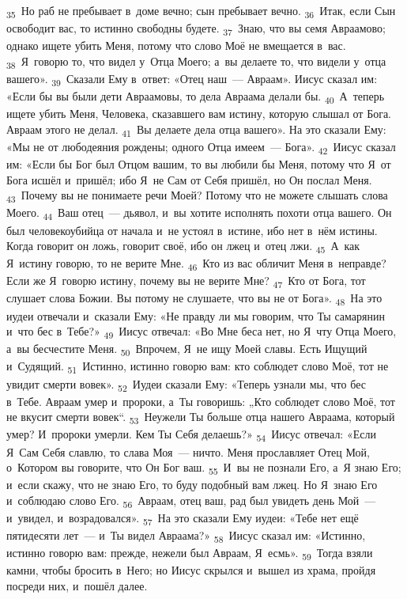 \documentclass[a4paper,12pt]{article}
\begin{document}
\textsubscript{35}~Но раб не пребывает в~доме вечно; сын пребывает вечно.
\textsubscript{36}~Итак, если Сын освободит вас, то истинно свободны будете.
\textsubscript{37}~Знаю, что вы семя Авраамово; однако ищете убить Меня, потому что слово Моё не вмещается в~вас.
\textsubscript{38}~Я~говорю то, что видел у~Отца Моего; а~вы делаете то, что видели у~отца вашего».
\textsubscript{39}~Сказали Ему в~ответ: «Отец наш~--- Авраам». Иисус сказал им: «Если бы вы были дети Авраамовы, то дела Авраама делали бы.
\textsubscript{40}~А~теперь ищете убить Меня, Человека, сказавшего вам истину, которую слышал от Бога. Авраам этого не делал.
\textsubscript{41}~Вы делаете дела отца вашего». На это сказали Ему: «Мы не от любодеяния рождены; одного Отца имеем~--- Бога».
\textsubscript{42}~Иисус сказал им: «Если бы Бог был Отцом вашим, то вы любили бы Меня, потому что Я~от Бога исшёл и~пришёл; ибо Я~не Сам от Себя пришёл, но Он послал Меня.
\textsubscript{43}~Почему вы не понимаете речи Моей? Потому что не можете слышать слова Моего.
\textsubscript{44}~Ваш отец~--- дьявол, и~вы хотите исполнять похоти отца вашего. Он был человекоубийца от начала и~не устоял в~истине, ибо нет в~нём истины. Когда говорит он ложь, говорит своё, ибо он лжец и~отец лжи.
\textsubscript{45}~А~как Я~истину говорю, то не верите Мне.
\textsubscript{46}~Кто из вас обличит Меня в~неправде? Если же Я~говорю истину, почему вы не верите Мне?
\textsubscript{47}~Кто от Бога, тот слушает слова Божии. Вы потому не слушаете, что вы не от Бога».
\textsubscript{48}~На это иудеи отвечали и~сказали Ему: «Не правду ли мы говорим, что Ты самарянин и~что бес в~Тебе?»
\textsubscript{49}~Иисус отвечал: «Во Мне беса нет, но Я~чту Отца Моего, а~вы бесчестите Меня.
\textsubscript{50}~Впрочем, Я~не ищу Моей славы. Есть Ищущий и~Судящий.
\textsubscript{51}~Истинно, истинно говорю вам: кто соблюдет слово Моё, тот не увидит смерти вовек».
\textsubscript{52}~Иудеи сказали Ему: «Теперь узнали мы, что бес в~Тебе. Авраам умер и~пророки, а~Ты говоришь: „Кто соблюдет слово Моё, тот не вкусит смерти вовек“.
\textsubscript{53}~Неужели Ты больше отца нашего Авраама, который умер? И~пророки умерли. Кем Ты Себя делаешь?»
\textsubscript{54}~Иисус отвечал: «Если Я~Сам Себя славлю, то слава Моя~--- ничто. Меня прославляет Отец Мой, о~Котором вы говорите, что Он Бог ваш.
\textsubscript{55}~И~вы не познали Его, а~Я знаю Его; и~если скажу, что не знаю Его, то буду подобный вам лжец. Но Я~знаю Его и~соблюдаю слово Его.
\textsubscript{56}~Авраам, отец ваш, рад был увидеть день Мой~--- и~увидел, и~возрадовался».
\textsubscript{57}~На это сказали Ему иудеи: «Тебе нет ещё пятидесяти лет~--- и~Ты видел Авраама?»
\textsubscript{58}~Иисус сказал им: «Истинно, истинно говорю вам: прежде, нежели был Авраам, Я~есмь».
\textsubscript{59}~Тогда взяли камни, чтобы бросить в~Него; но Иисус скрылся и~вышел из храма, пройдя посреди них, и~пошёл далее. 
\end{document}
